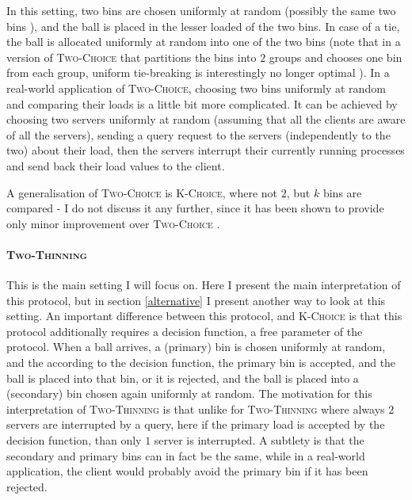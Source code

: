 In this setting, two bins are chosen uniformly at random (possibly the same two bins ), and the ball is placed in the lesser loaded of the two bins. In case of a tie, the ball is allocated uniformly at random into one of the two bins (note that in a version of \textsc{Two-Choice} that partitions the bins into $2$ groups and chooses one bin from each group, uniform tie-breaking is interestingly no longer optimal \cite{vocking2003tiebreaking}). In a real-world application of \textsc{Two-Choice}, choosing two bins uniformly at random and comparing their loads is a little bit more complicated. It can be achieved by choosing two servers uniformly at random (assuming that all the clients are aware of all the servers), sending a query request to the servers (independently to the two) about their load, then the servers interrupt their currently running processes and send back their load values to the client.

A generalisation of \textsc{Two-Choice} is \textsc{K-Choice}, where not $2$, but $k$ bins are compared - I do not discuss it any further, since it has been shown to provide only minor improvement over \textsc{Two-Choice} \cite{azar1999twochoice}.


\paragraph{\textsc{Two-Thinning}}


This is the main setting I will focus on. Here I present the main interpretation of this protocol, but in section \ref{alternative} I present another way to look at this setting. An important difference between this protocol, and \textsc{K-Choice} is that this protocol additionally requires a decision function, a free parameter of the protocol. When a ball arrives, a (primary) bin is chosen uniformly at random, and the according to the decision function, the primary bin is accepted, and the ball is placed into that bin, or it is rejected, and the ball is placed into a (secondary) bin chosen again uniformly at random. The motivation for this interpretation of \textsc{Two-Thinning} is that unlike for \textsc{Two-Thinning} where always $2$ servers are interrupted by a query, here if the primary load is accepted by the decision function, than only $1$ server is interrupted. A subtlety is that the secondary and primary bins can in fact be the same, while in a real-world application, the client would probably avoid the primary bin if it has been rejected.


